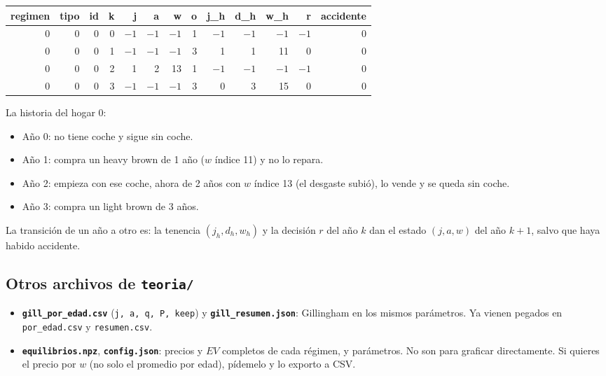 \documentclass[11pt]{article}
\newcommand{\col}[1]{\texttt{#1}}
\newcommand{\archivo}[1]{\textbf{\texttt{#1}}}
\begin{document}
\begin{center}\footnotesize
\begin{adjustbox}{max width=\textwidth}\begin{tabular}{rrrrrrrrrrrrr}
\toprule
regimen & tipo & id & k & j & a & w & o & j\_h & d\_h & w\_h & r & accidente\\
\midrule
0 & 0 & 0 & 0 & $-1$ & $-1$ & $-1$ & 1 & $-1$ & $-1$ & $-1$ & $-1$ & 0\\
0 & 0 & 0 & 1 & $-1$ & $-1$ & $-1$ & 3 & 1 & 1 & 11 & 0 & 0\\
0 & 0 & 0 & 2 & 1 & 2 & 13 & 1 & $-1$ & $-1$ & $-1$ & $-1$ & 0\\
0 & 0 & 0 & 3 & $-1$ & $-1$ & $-1$ & 3 & 0 & 3 & 15 & 0 & 0\\
\bottomrule
\end{tabular}\end{adjustbox}
\end{center}
La historia del hogar 0:
\begin{itemize}
  \item Año 0: no tiene coche y sigue sin coche.
  \item Año 1: compra un heavy brown de 1 año ($w$ índice 11) y no lo repara.
  \item Año 2: empieza con ese coche, ahora de 2 años con $w$ índice 13 (el desgaste subió),
  lo vende y se queda sin coche.
  \item Año 3: compra un light brown de 3 años.
\end{itemize}
La transición de un año a otro es: la tenencia $(j_h,d_h,w_h)$ y la decisión $r$ del año $k$
dan el estado $(j,a,w)$ del año $k+1$, salvo que haya habido accidente.

\subsection{Otros archivos de \texttt{teoria/}}
\begin{itemize}
  \item \archivo{gill\_por\_edad.csv} (\col{j, a, q, P, keep}) y
  \archivo{gill\_resumen.json}: Gillingham en los mismos parámetros. Ya vienen pegados en
  \texttt{por\_edad.csv} y \texttt{resumen.csv}.
  \item \archivo{equilibrios.npz}, \archivo{config.json}: precios y $EV$ completos de cada
  régimen, y parámetros. No son para graficar directamente. Si quieres el precio por $w$
  (no solo el promedio por edad), pídemelo y lo exporto a CSV.
\end{itemize}
\end{document}

